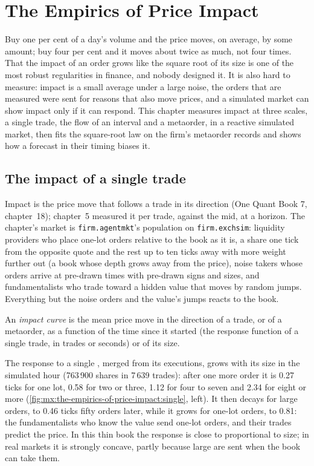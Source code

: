\chapter{The Empirics of Price Impact}\label{ch:mx:the-empirics-of-price-impact}

Buy one per cent of a day's volume and the price moves, on average, by some amount; buy four per cent and it moves about twice as much, not four times.
That the impact of an order grows like the square root of its size is one of the most robust regularities in finance, and nobody designed it. It is also
hard to measure: impact is a small average under a large noise, the orders that are measured were sent for reasons that also move prices, and a simulated
market can show impact only if it can respond. This chapter measures impact at three scales, a single trade, the flow of an interval and a metaorder, in
a reactive simulated market, then fits the square-root law on the firm's metaorder records and shows how a forecast in their timing biases it.

\section{The impact of a single trade}

Impact is the price move that follows a trade in its direction (One Quant Book 7, chapter~18); chapter~5 measured it per trade, against the mid, at a
horizon. The chapter's market is \texttt{firm.agentmkt}'s population on \texttt{firm.exchsim}: liquidity providers who place one-lot orders relative to
the book as it is, a share one tick from the opposite quote and the rest up to ten ticks away with more weight further out (a book whose depth grows away
from the price), noise takers whose orders arrive at pre-drawn times with pre-drawn signs and sizes, and fundamentalists who trade toward a hidden value
that moves by random jumps. Everything but the noise orders and the value's jumps reacts to the book.

\begin{definition}\label{def:mx:the-empirics-of-price-impact:curve}
An \emph{impact curve} is the mean price move in the direction of a trade, or of a metaorder, as a function of the time since it
started (the response function of a single trade, in trades or seconds) or of its size.
\end{definition}

The response to a single , merged from its executions, grows with its size in the simulated hour (763\,900 shares in 7\,639 trades): after one
more order it is 0.27 ticks for one lot, 0.58 for two or three, 1.12 for four to seven and 2.34 for eight or more (\cref{fig:mx:the-empirics-of-price-impact:single},
left). It then decays for large orders, to 0.46 ticks fifty orders later, while it grows for one-lot orders, to 0.81: the fundamentalists who know the
value send one-lot orders, and their trades predict the price. In this thin book the response is close to proportional to size; in real markets it is
strongly concave, partly because large  are sent when the book can take them.

